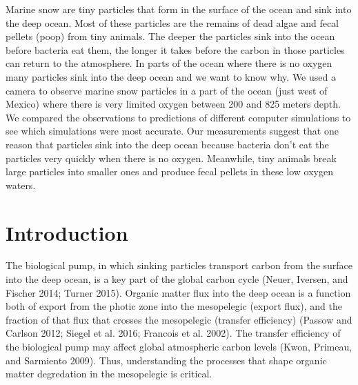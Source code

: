 \documentclass[]{article}
\begin{document}
Marine snow are tiny particles that form in the surface of the ocean and
sink into the deep ocean. Most of these particles are the remains of
dead algae and fecal pellets (poop) from tiny animals. The deeper the
particles sink into the ocean before bacteria eat them, the longer it
takes before the carbon in those particles can return to the atmosphere.
In parts of the ocean where there is no oxygen many particles sink into
the deep ocean and we want to know why. We used a camera to observe
marine snow particles in a part of the ocean (just west of Mexico) where
there is very limited oxygen between 200 and 825 meters depth. We
compared the observations to predictions of different computer
simulations to see which simulations were most accurate. Our
measurements suggest that one reason that particles sink into the deep
ocean because bacteria don't eat the particles very quickly when there
is no oxygen. Meanwhile, tiny animals break large particles into smaller
ones and produce fecal pellets in these low oxygen waters.

\hypertarget{introduction}{%
\section{Introduction}\label{introduction}}

The biological pump, in which sinking particles transport carbon from
the surface into the deep ocean, is a key part of the global carbon
cycle (Neuer, Iversen, and Fischer 2014; Turner 2015). Organic matter
flux into the deep ocean is a function both of export from the photic
zone into the mesopelegic (export flux), and the fraction of that flux
that crosses the mesopelegic (transfer efficiency) (Passow and Carlson
2012; Siegel et al. 2016; Francois et al. 2002). The transfer efficiency
of the biological pump may affect global atmospheric carbon levels
(Kwon, Primeau, and Sarmiento 2009). Thus, understanding the processes
that shape organic matter degredation in the mesopelegic is critical.
\end{document}
